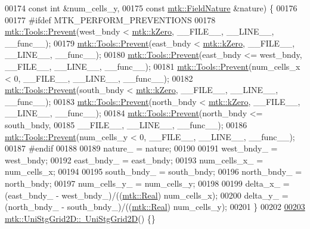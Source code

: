 \begin{DoxyCode}
00174                                 \textcolor{keyword}{const} \textcolor{keywordtype}{int} &num\_cells\_y,
00175                                 \textcolor{keyword}{const} \hyperlink{group__c02-enums_ga4c54f2a329cfb4e56213b02a259d19e2}{mtk::FieldNature} &nature) \{
00176 
00177 \textcolor{preprocessor}{  #ifdef MTK\_PERFORM\_PREVENTIONS}
00178   \hyperlink{classmtk_1_1Tools_a332324c6f25e66be9dff48c5987a3b9f}{mtk::Tools::Prevent}(west\_bndy < \hyperlink{group__c01-roots_ga59a451a5fae30d59649bcda274fea271}{mtk::kZero}, \_\_FILE\_\_, \_\_LINE\_\_, \_\_func\_\_);
00179   \hyperlink{classmtk_1_1Tools_a332324c6f25e66be9dff48c5987a3b9f}{mtk::Tools::Prevent}(east\_bndy < \hyperlink{group__c01-roots_ga59a451a5fae30d59649bcda274fea271}{mtk::kZero}, \_\_FILE\_\_, \_\_LINE\_\_, \_\_func\_\_);
00180   \hyperlink{classmtk_1_1Tools_a332324c6f25e66be9dff48c5987a3b9f}{mtk::Tools::Prevent}(east\_bndy <= west\_bndy, \_\_FILE\_\_, \_\_LINE\_\_, \_\_func\_\_);
00181   \hyperlink{classmtk_1_1Tools_a332324c6f25e66be9dff48c5987a3b9f}{mtk::Tools::Prevent}(num\_cells\_x < 0, \_\_FILE\_\_, \_\_LINE\_\_, \_\_func\_\_);
00182   \hyperlink{classmtk_1_1Tools_a332324c6f25e66be9dff48c5987a3b9f}{mtk::Tools::Prevent}(south\_bndy < \hyperlink{group__c01-roots_ga59a451a5fae30d59649bcda274fea271}{mtk::kZero}, \_\_FILE\_\_, \_\_LINE\_\_, \_\_func\_\_);
00183   \hyperlink{classmtk_1_1Tools_a332324c6f25e66be9dff48c5987a3b9f}{mtk::Tools::Prevent}(north\_bndy < \hyperlink{group__c01-roots_ga59a451a5fae30d59649bcda274fea271}{mtk::kZero}, \_\_FILE\_\_, \_\_LINE\_\_, \_\_func\_\_);
00184   \hyperlink{classmtk_1_1Tools_a332324c6f25e66be9dff48c5987a3b9f}{mtk::Tools::Prevent}(north\_bndy <= south\_bndy,
00185                       \_\_FILE\_\_, \_\_LINE\_\_, \_\_func\_\_);
00186   \hyperlink{classmtk_1_1Tools_a332324c6f25e66be9dff48c5987a3b9f}{mtk::Tools::Prevent}(num\_cells\_y < 0, \_\_FILE\_\_, \_\_LINE\_\_, \_\_func\_\_);
00187 \textcolor{preprocessor}{  #endif}
00188 
00189   nature\_ = nature;
00190 
00191   west\_bndy\_ = west\_bndy;
00192   east\_bndy\_ = east\_bndy;
00193   num\_cells\_x\_ = num\_cells\_x;
00194 
00195   south\_bndy\_ = south\_bndy;
00196   north\_bndy\_ = north\_bndy;
00197   num\_cells\_y\_ = num\_cells\_y;
00198 
00199   delta\_x\_ = (east\_bndy\_ - west\_bndy\_)/((\hyperlink{group__c01-roots_gac080bbbf5cbb5502c9f00405f894857d}{mtk::Real}) num\_cells\_x);
00200   delta\_y\_ = (north\_bndy\_ - south\_bndy\_)/((\hyperlink{group__c01-roots_gac080bbbf5cbb5502c9f00405f894857d}{mtk::Real}) num\_cells\_y);
00201 \}
00202 
\hypertarget{mtk__uni__stg__grid__2d_8cc_source_l00203}{}\hyperlink{classmtk_1_1UniStgGrid2D_a55615fed9674be8d8a48a1105e5a1476}{00203} \hyperlink{classmtk_1_1UniStgGrid2D_a55615fed9674be8d8a48a1105e5a1476}{mtk::UniStgGrid2D::~UniStgGrid2D}() \{\}

\end{DoxyCode}
